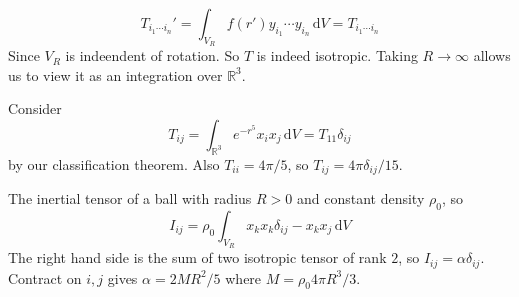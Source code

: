 $$T_{i_1\cdots i_n}'=\int_{V_R}f(r')y_{i_1}\cdots y_{i_n}\,\mathrm dV=T_{i_1\cdots i_n}$$
Since $V_R$ is indeendent of rotation.
So $T$ is indeed isotropic.
Taking $R\to\infty$ allows us to view it as an integration over $\mathbb R^3$.
\begin{example}
    Consider
    $$T_{ij}=\int_{\mathbb R^3}e^{-r^5}x_ix_j\,\mathrm dV=T_{11}\delta_{ij}$$
    by our classification theorem.
    Also $T_{ii}=4\pi/5$, so $T_{ij}=4\pi\delta_{ij}/15$.
\end{example}
\begin{example}
    The inertial tensor of a ball with radius $R>0$ and constant density $\rho_0$, so
    $$I_{ij}=\rho_0\int_{V_R}x_kx_k\delta_{ij}-x_kx_j\,\mathrm dV$$
    The right hand side is the sum of two isotropic tensor of rank $2$, so $I_{ij}=\alpha\delta_{ij}$.
    Contract on $i,j$ gives $\alpha=2MR^2/5$ where $M=\rho_0 4\pi R^3/3$.
\end{example}
